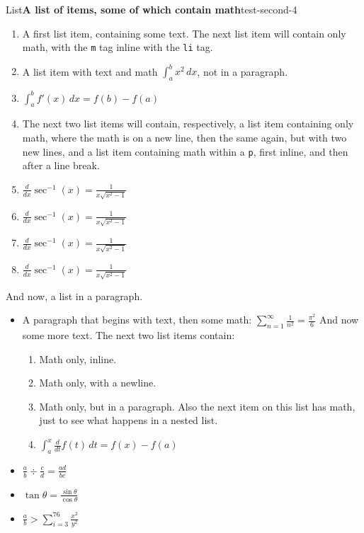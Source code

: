 \documentclass{amsart}
\theoremstyle{plain}%
\theoremstyle{definition}%
\theoremstyle{remark}%
\newcommand{\mono}[1]{\texttt{#1}}
\numberwithin{equation}{section}
\newcommand{\gt}{>}
\begin{document}
\begin{listptx}{List}{\textbf{A list of items, some of which contain math}}{test-second-4}{}%
%
\begin{enumerate}
\item{}A first list item, containing some text. The next list item will contain only math, with the \mono{m} tag inline with the \mono{li} tag.%
\item{}A list item with text and math \(\int_a^b x^2\,dx\), not in a paragraph.%
\item{}\(\displaystyle \int_a^b f'(x)\, dx = f(b)-f(a)\)%
\item{}The next two list items will contain, respectively, a list item containing only math, where the math is on a new line, then the same again, but with two new lines, and a list item containing math within a \mono{p}, first inline, and then after a line break.%
\item{}\(\displaystyle \frac{d}{dx}\sec^{-1}(x) = \frac{1}{x\sqrt{x^2-1}}\)%
\item{}\(\displaystyle \frac{d}{dx}\sec^{-1}(x) = \frac{1}{x\sqrt{x^2-1}}\)%
\item{}\(\displaystyle \frac{d}{dx}\sec^{-1}(x) = \frac{1}{x\sqrt{x^2-1}}\)%
\item{}\(\displaystyle \frac{d}{dx}\sec^{-1}(x) = \frac{1}{x\sqrt{x^2-1}}\)%
\end{enumerate}
\end{listptx}%
And now, a list in a paragraph.%
\par
%
\begin{itemize}[label=\textbullet]
\item{}A paragraph that begins with text, then some math: \(\sum_{n=1}^\infty\frac{1}{n^2}=\frac{\pi^2}{6}\) And now some more text. The next two list items contain:%
\begin{enumerate}
\item{}Math only, inline.%
\item{}Math only, with a newline.%
\item{}Math only, but in a paragraph. Also the next item on this list has math, just to see what happens in a nested list.%
\item{}\(\displaystyle \int_a^x \frac{d}{dt}f(t)\,dt = f(x)-f(a)\)%
\end{enumerate}
%
\item{}\(\displaystyle \frac{a}{b}\div \frac{c}{d} = \frac{ad}{bc}\)%
\item{}\(\displaystyle \tan\theta = \frac{\sin\theta}{\cos\theta}\)%
\item{}\(\displaystyle \frac{a}{b}\gt \sum_{i=3}^{76}\frac{x^2}{y^2}\)%
\end{itemize}
\end{document}
